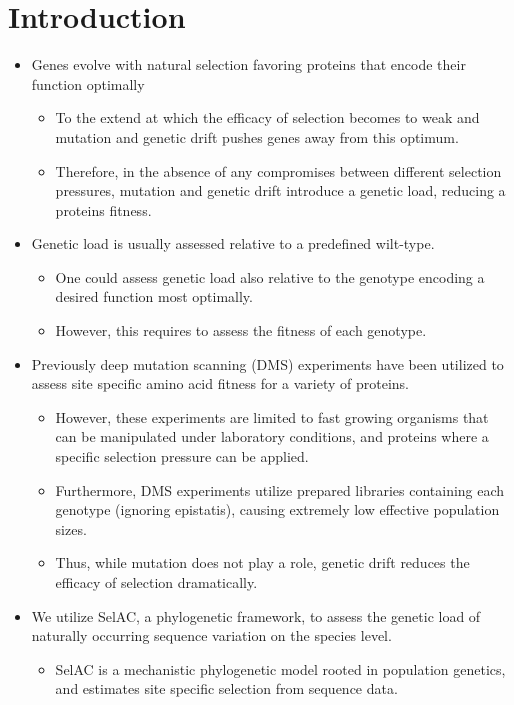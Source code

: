 \documentclass[12pt]{article}
\begin{document}
\section*{Introduction}
\begin{itemize}
	\item Genes evolve with natural selection favoring proteins that encode their function optimally
	\begin{itemize}
		\item To the extend at which the efficacy of selection becomes to weak and mutation and genetic drift pushes genes away from this optimum.
		\item Therefore, in the absence of any compromises between different selection pressures, mutation and genetic drift introduce a genetic load, reducing a proteins fitness. 
	\end{itemize}
	\item Genetic load is usually assessed relative to a predefined wilt-type.
	\begin{itemize}
		\item One could assess genetic load also relative to the genotype encoding a desired function most optimally.
		\item However, this requires to assess the fitness of each genotype. 
	\end{itemize}
	\item Previously deep mutation scanning (DMS) experiments have been utilized to assess site specific amino acid fitness for a variety of proteins.
	\begin{itemize}
		\item However, these experiments are limited to fast growing organisms that can be manipulated under laboratory conditions, and proteins where a specific selection pressure can be applied.
		\item Furthermore, DMS experiments utilize prepared libraries containing each genotype (ignoring epistatis), causing extremely low effective population sizes. 
		\item Thus, while mutation does not play a role, genetic drift reduces the efficacy of selection dramatically. 
	\end{itemize}
	\item We utilize SelAC, a phylogenetic framework, to assess the genetic load of naturally occurring sequence variation on the species level.
	\begin{itemize}
		\item SelAC is a mechanistic phylogenetic model rooted in population genetics, and estimates site specific selection from sequence data.

\end{itemize}
\end{itemize}
\end{document}
